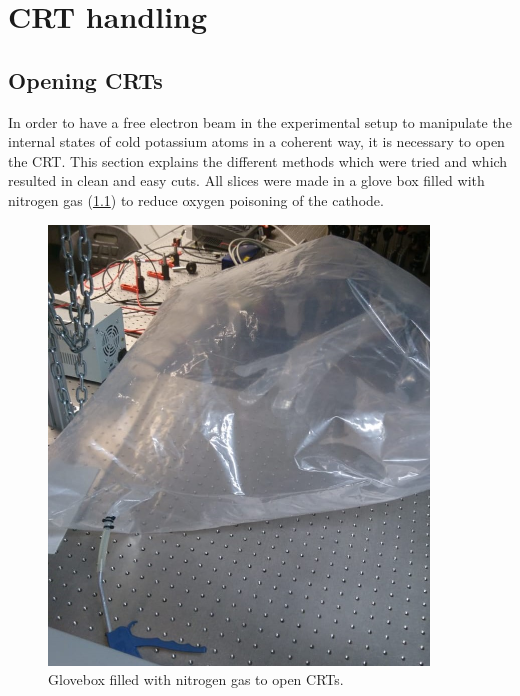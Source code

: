 
\chapter{CRT handling}
\label{chap:CRT handling}

\section{Opening CRTs}
\label{sec:Opening CRTs}

In order to have a free electron beam in the experimental setup to  manipulate the internal states of cold potassium atoms in a coherent way, it is necessary to open the CRT. This section explains the different methods which were tried and which resulted in clean and easy cuts. All slices were made in a glove box filled with nitrogen gas (\cref{fig:glovebox}) to reduce oxygen poisoning of the cathode.

\begin{figure}[ht]
	\centering
	\includegraphics[width=0.9\textwidth]{./Chapters/CRT-handling/glove_box}
	\caption{Glovebox filled with nitrogen gas to open CRTs.}
	\label{fig:glovebox}
\end{figure}


